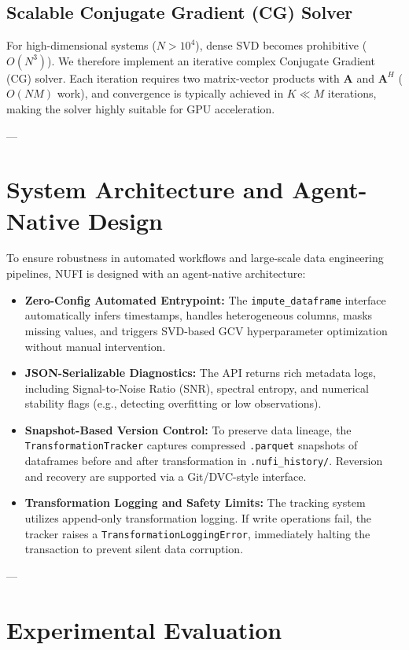 \documentclass[11pt,a4paper]{article}
\begin{document}
\subsection{Scalable Conjugate Gradient (CG) Solver}
For high-dimensional systems ($N > 10^4$), dense SVD becomes prohibitive ($O(N^3)$). We therefore implement an iterative complex Conjugate Gradient (CG) solver. Each iteration requires two matrix-vector products with $\mathbf{A}$ and $\mathbf{A}^H$ ($O(N M)$ work), and convergence is typically achieved in $K \ll M$ iterations, making the solver highly suitable for GPU acceleration.

---

\section{System Architecture and Agent-Native Design}

To ensure robustness in automated workflows and large-scale data engineering pipelines, NUFI is designed with an agent-native architecture:

\begin{itemize}
    \item \textbf{Zero-Config Automated Entrypoint:} The \texttt{impute\_dataframe} interface automatically infers timestamps, handles heterogeneous columns, masks missing values, and triggers SVD-based GCV hyperparameter optimization without manual intervention.
    \item \textbf{JSON-Serializable Diagnostics:} The API returns rich metadata logs, including Signal-to-Noise Ratio (SNR), spectral entropy, and numerical stability flags (e.g., detecting overfitting or low observations).
    \item \textbf{Snapshot-Based Version Control:} To preserve data lineage, the \texttt{TransformationTracker} captures compressed \texttt{.parquet} snapshots of dataframes before and after transformation in \texttt{.nufi\_history/}. Reversion and recovery are supported via a Git/DVC-style interface.
    \item \textbf{Transformation Logging and Safety Limits:} The tracking system utilizes append-only transformation logging. If write operations fail, the tracker raises a \texttt{TransformationLoggingError}, immediately halting the transaction to prevent silent data corruption.
\end{itemize}

---

\section{Experimental Evaluation}
\end{document}
